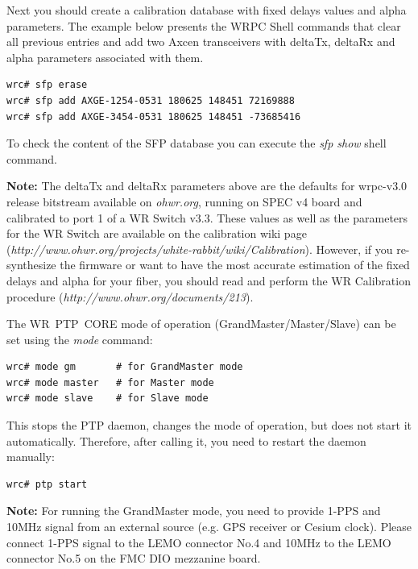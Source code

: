\documentclass[a4paper, 12pt]{article}
\newcommand{\codeHook}[1]{\mbox{\ttfamily\MakeTextUppercase{#1}}}
\begin{document}
\vspace{1em}
Next you should create a calibration database with fixed delays values and
alpha parameters. The example below presents the \codeHook{wrpc} Shell commands that
clear all previous entries and add two Axcen transceivers with deltaTx, deltaRx
and alpha parameters associated with them.

\begin{lstlisting}
wrc# sfp erase
wrc# sfp add AXGE-1254-0531 180625 148451 72169888
wrc# sfp add AXGE-3454-0531 180625 148451 -73685416
\end{lstlisting}

To check the content of the \codeHook{sfp} database you can execute the \textit{sfp show} shell
command.

\noindent\textbf{Note:} The deltaTx and deltaRx parameters above are the defaults for
wrpc-v3.0 release bitstream available on \textit{ohwr.org}, running on
\codeHook{spec} v4 board and calibrated to port 1 of a \codeHook{wr} Switch v3.3. These
values as well as the parameters for the \codeHook{wr} Switch are available on the
calibration wiki page
(\textit{http://www.ohwr.org/projects/white-rabbit/wiki/Calibration}). However, if
you re-synthesize the firmware or want to have the most accurate estimation of
the fixed delays and alpha for your fiber, you should read and perform the
\codeHook{wr} Calibration procedure (\textit{http://www.ohwr.org/documents/213}).

\vspace{1em}
The \codeHook{wr ptp core} mode of operation (GrandMaster/Master/Slave) can be set
using the \textit{mode} command:

\begin{lstlisting}
wrc# mode gm       # for GrandMaster mode
wrc# mode master   # for Master mode
wrc# mode slave    # for Slave mode
\end{lstlisting}

This stops the \codeHook{ptp} daemon, changes the mode of operation, but does not
start it automatically. Therefore, after calling it, you need to restart the
daemon manually:

\begin{lstlisting}
wrc# ptp start
\end{lstlisting}

\noindent\textbf{Note:} For running the GrandMaster mode, you need to provide 1-PPS and 10MHz
signal from an external source (e.g. GPS receiver or Cesium clock). Please
connect 1-PPS signal to the LEMO connector No.4 and 10MHz to the LEMO connector
No.5 on the \codeHook{fmc} \codeHook{dio} mezzanine board.
\end{document}
